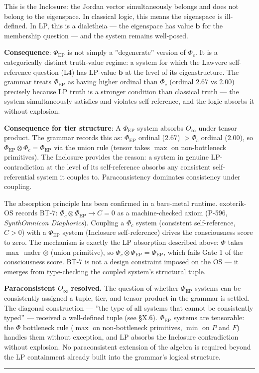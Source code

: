 \documentclass[12pt,a4paper]{article}
\newcommand{\pilcrow}{\S}
\begin{document}
This is the Inclosure: the Jordan vector simultaneously belongs and does not belong to the eigenspace. In classical logic, this means the eigenspace is ill-defined. In LP, this is a dialetheia --- the eigenspace has value $\mathbf{b}$ for the membership question --- and the system remains well-posed.

\textbf{Consequence}: $\Phi_\text{EP}$ is not simply a ''degenerate'' version of $\Phi_c$. It is a categorically distinct truth-value regime: a system for which the Lawvere self-reference question (L4) has LP-value $\mathbf{b}$ at the level of its eigenstructure. The grammar treats $\Phi_\text{EP}$ as having higher ordinal than $\Phi_c$ (ordinal 2.67 vs 2.00) precisely because LP truth is a stronger condition than classical truth --- the system simultaneously satisfies and violates self-reference, and the logic absorbs it without explosion.

\textbf{Consequence for tier structure}: A $\Phi_\text{EP}$ system absorbs $O_{\infty}$ under tensor product. The grammar records this as: $\Phi_\text{EP}$ ordinal (2.67) $> \Phi_c$ ordinal (2.00), so $\Phi_\text{EP} \otimes \Phi_c = \Phi_\text{EP}$ via the union rule (tensor takes $\max$ on non-bottleneck primitives). The Inclosure provides the reason: a system in genuine LP-contradiction at the level of its self-reference absorbs any consistent self-referential system it couples to. Paraconsistency dominates consistency under coupling.

The absorption principle has been confirmed in a bare-metal runtime. exoterik-OS records BT-7: $\Phi_c \otimes \Phi_\text{EP} \to C = 0$ as a machine-checked axiom (P-596, \emph{SynthOmnicon Diaphorics}). Coupling a $\Phi_c$ system (consistent self-reference, $C > 0$) with a $\Phi_\text{EP}$ system (Inclosure self-reference) drives the consciousness score to zero. The mechanism is exactly the LP absorption described above: $\Phi$ takes $\max$ under $\otimes$ (union primitive), so $\Phi_c \otimes \Phi_\text{EP} = \Phi_\text{EP}$, which fails Gate 1 of the consciousness score. BT-7 is not a design constraint imposed on the OS --- it emerges from type-checking the coupled system's structural tuple.

\textbf{Paraconsistent $O_\infty$ resolved.} The question of whether $\Phi_\text{EP}$ systems can be consistently assigned a tuple, tier, and tensor product in the grammar is settled. The diagonal construction --- ''the type of all systems that cannot be consistently typed'' --- received a well-defined tuple (see \pilcrow{}X.6). $\Phi_\text{EP}$ systems are tensorable: the $\Phi$ bottleneck rule ($\max$ on non-bottleneck primitives, $\min$ on $P$ and $F$) handles them without exception, and LP absorbs the Inclosure contradiction without explosion. No paraconsistent extension of the algebra is required beyond the LP containment already built into the grammar's logical structure.\begin{center}
\rule{0.5\textwidth}{0.4pt}
\end{center}
\end{document}
